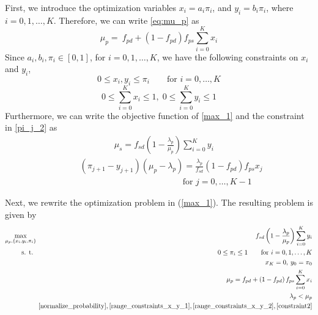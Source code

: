 \documentclass[conference]{IEEEtran}
\begin{document}
First, we introduce the optimization variables  $x_i = a_i\pi_i$,
and $y_i = b_i\pi_i$, where $i \!=\! 0, 1,\ldots,K$. Therefore, we
can write \eqref{eq:mu_p} as
\begin{equation}
\mu_p \!=\!\ f_{pd} + \left(1-f_{pd}\right) f_{ps} \sum_{i=0}^K x_i  \label{constraint1}
  \end{equation}
Since $a_i, b_i, \pi_i \in [0,1]$, for $i=0,1,\ldots,K$, we have the
following constraints on $x_i$ and $y_i$,
\begin{equation}\label{range_constraints_x_y_1}
    0 \leq x_i, y_i \leq \pi_i \qquad\text{for } i=0, \ldots, K
\end{equation}
\begin{equation}\label{range_constraints_x_y_2}
	0 \leq \displaystyle\sum_{i=0}^K x_i \leq 1,\; 0 \leq \displaystyle\sum_{i=0}^K y_i \leq 1
\end{equation}
Furthermore, we can write the objective function of \eqref{max_1}
 and the constraint in \eqref{pi_j_2} as
\begin{eqnarray}
 \!\!\!\!\!\!&&\!\!\!\!\!\!\qquad\qquad\qquad\mu_s = f_{sd} \left( 1 -
\frac{\lambda_p}{\mu_p}
\right) \displaystyle\sum_{i=0}^K y_i \label{objective}\\
\!\!\!\!\!&&\!\!\!\!\!\!\qquad\left(\pi_{j\!+\!1} \!-\!
y_{j\!+\!1}\right)\! \left(\mu_p \!-\! \lambda_p\right) \! =\!
\frac{\lambda_p}{f_{sd}} \left(1 \!-\!
f_{pd}\right) f_{ps} x_j \nonumber\\
\!\!\!\!\!\!&&\!\!\!\!\!\!\qquad\qquad\qquad\qquad\qquad\qquad\qquad
\text{for } j\!=\!0,\ldots,K\!-\!1 \qquad \label{constraint2}
  \end{eqnarray}





Next, we rewrite the optimization problem in (\ref{max_1}). The resulting problem is given by
\begin{eqnarray}
\max_{\mu_p, \{x_i, y_i, \pi_i\}} \!\!&&\!\! f_{sd} \left( 1 -
\frac{\lambda_p}{\mu_p} \right) \displaystyle\sum_{i=0}^K y_i \nonumber \\
  \text{s. t. } \!\!&&\!\!   0 \leq \pi_i \leq 1 \qquad \text{for } i=0,1,\ldots, K  \nonumber \\
  \!\!&& \!\!  x_K=0,\: y_0=\pi_0   \nonumber\\
  \!\!&& \!\!  \mu_p = f_{pd} + \left(1-f_{pd}\right) f_{ps} \sum_{i=0}^K x_i   \nonumber\\
  \!\!&& \!\!  \lambda_p < \mu_p \nonumber\\
  \!\!&& \!\!
   \eqref{normalize_probability},\eqref{range_constraints_x_y_1},\eqref{range_constraints_x_y_2},\eqref{constraint2}
  \label{max_2}
  \end{eqnarray}
\end{document}

